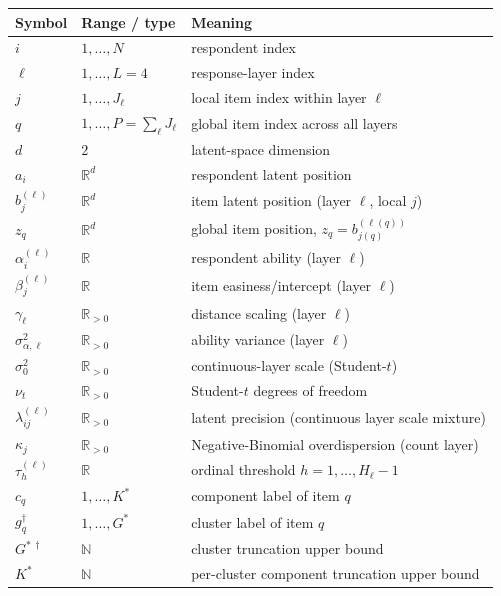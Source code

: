 \documentclass[11pt]{article}
\newcommand{\R}{\mathbb{R}}
\begin{document}
\begin{table}[H]
\centering
\small
\begin{tabular}{l l l}
\toprule
Symbol & Range / type & Meaning \\
\midrule
$i$        & $1,\ldots,N$            & respondent index \\
$\ell$     & $1,\ldots,L=4$          & response-layer index \\
$j$        & $1,\ldots,J_\ell$       & local item index within layer $\ell$ \\
$q$        & $1,\ldots,P=\sum_\ell J_\ell$ & global item index across all layers \\
$d$        & $2$                     & latent-space dimension \\
$a_i$      & $\R^d$                  & respondent latent position \\
$b_j^{(\ell)}$ & $\R^d$              & item latent position (layer $\ell$, local $j$) \\
$z_q$      & $\R^d$                  & global item position, $z_q = b_{j(q)}^{(\ell(q))}$ \\
$\alpha_i^{(\ell)}$ & $\R$           & respondent ability (layer $\ell$) \\
$\beta_j^{(\ell)}$  & $\R$           & item easiness/intercept (layer $\ell$) \\
$\gamma_\ell$ & $\R_{>0}$            & distance scaling (layer $\ell$) \\
$\sigma_{\alpha,\ell}^2$ & $\R_{>0}$ & ability variance (layer $\ell$) \\
$\sigma_0^2$ & $\R_{>0}$             & continuous-layer scale (Student-$t$) \\
$\nu_t$ & $\R_{>0}$                  & Student-$t$ degrees of freedom \\
$\lambda_{ij}^{(\ell)}$ & $\R_{>0}$  & latent precision (continuous layer scale mixture) \\
$\kappa_j$ & $\R_{>0}$               & Negative-Binomial overdispersion (count layer) \\
$\tau_h^{(\ell)}$ & $\R$              & ordinal threshold $h=1,\ldots,H_\ell-1$ \\
\midrule
$c_q$      & $1,\ldots,K^*$          & component label of item $q$ \\
$g_q^{\dagger}$ & $1,\ldots,G^*$     & cluster label of item $q$ \\
$G^{*\,\dagger}$ & $\mathbb{N}$       & cluster truncation upper bound \\
$K^*$      & $\mathbb{N}$            & per-cluster component truncation upper bound \\

\end{tabular}
\end{table}
\end{document}
